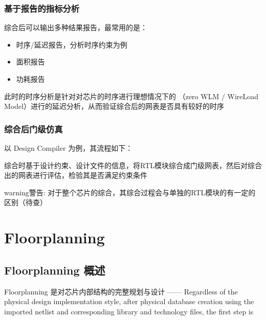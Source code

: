 \documentclass[letterpaper,10pt,english]{sphinxmanual}
\begin{document}
\subsection{基于报告的指标分析}
\label{\detokenize{chapter4/_u7efc_u5408_u7ed3_u679c_u8bc4_u4f30:id2}}
\sphinxAtStartPar
综合后可以输出多种结果报告，最常用的是：
\begin{itemize}
\item {} 
\sphinxAtStartPar
时序/延迟报告，分析时序约束为例

\item {} 
\sphinxAtStartPar
面积报告

\item {} 
\sphinxAtStartPar
功耗报告

\end{itemize}

\sphinxAtStartPar
此时的时序分析是针对对芯片的时序进行理想情况下的  （zero WLM / Wire\sphinxhyphen{}Load Model）进行的延迟分析，从而验证综合后的网表是否具有较好的时序


\subsection{综合后门级仿真}
\label{\detokenize{chapter4/_u7efc_u5408_u7ed3_u679c_u8bc4_u4f30:id3}}
\sphinxAtStartPar
以 Design Compiler 为例，其流程如下：

\begin{figure}[htbp]
\centering

\noindent{}
\end{figure}

\sphinxAtStartPar
综合时基于设计约束、设计文件的信息，将RTL模块综合成门级网表，然后对综合出的网表进行评估，检验其是否满足约束条件

\begin{sphinxadmonition}{warning}{警告:}
\sphinxAtStartPar
对于整个芯片的综合，其综合过程会与单独的RTL模块的有一定的区别（待查）
\end{sphinxadmonition}


\chapter{Floorplanning}
\label{\detokenize{chapter5/index:floorplanning}}\label{\detokenize{chapter5/index::doc}}

\section{Floorplanning 概述}
\label{\detokenize{chapter5/_u6982_u8ff0:floorplanning}}\label{\detokenize{chapter5/_u6982_u8ff0::doc}}
\sphinxAtStartPar
Floorplanning 是对芯片内部结构的完整规划与设计 —— Regardless of the physical design implementation style, after physical database creation using the imported netlist and corresponding library and technology files, the first step is 
\end{document}
